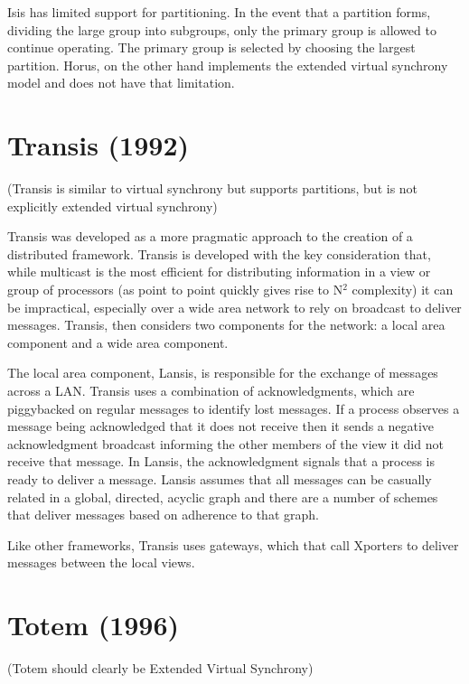 Isis has limited support for partitioning. In the event that
a partition forms, dividing the large group into subgroups, only the primary
group is allowed to continue operating. The primary group is selected by
choosing the largest partition. Horus, on the other hand implements the extended
virtual synchrony model and does not have that limitation.

\section{Transis (1992)}

(Transis is similar to virtual synchrony but supports partitions, but is not explicitly extended virtual synchrony)

Transis was developed as a more pragmatic approach to the creation of a distributed
framework. Transis is developed with the key consideration that, while multicast is
the most efficient for distributing information in a view or group of processors (as
point to point quickly gives rise to N$^{2}$ complexity) it can be impractical, especially
over a wide area network to rely on broadcast to deliver messages. Transis, then
considers two components for the network: a local area component and a wide area 
component.

The local area component, Lansis, is responsible for the exchange of messages across a
LAN. Transis uses a combination of acknowledgments, which are piggybacked on regular
messages to identify lost messages. If a process observes a message being acknowledged
that it does not receive then it sends a negative acknowledgment broadcast informing
the other members of the view it did not receive that message. In Lansis, the 
acknowledgment signals that a process is ready to deliver a message. Lansis assumes
that all messages can be casually related in a global, directed, acyclic graph and
there are a number of schemes that deliver messages based on adherence to that graph.

Like other frameworks, Transis uses gateways, which that call Xporters to deliver
messages between the local views. 

\section{Totem (1996)}

(Totem should clearly be Extended Virtual Synchrony)


